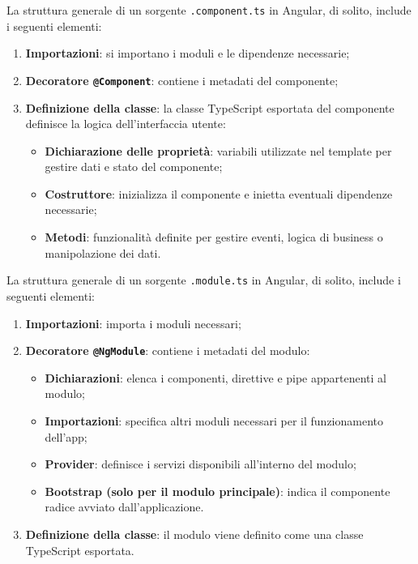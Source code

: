 La struttura generale di un sorgente \texttt{.component.ts} in Angular, di solito, include i seguenti elementi:
\begin{enumerate}
    \item \textbf{Importazioni}: si importano i moduli e le dipendenze necessarie; 
    \item \textbf{Decoratore \texttt{@Component}}: contiene i metadati del componente;
    \item \textbf{Definizione della classe}: la classe TypeScript esportata del componente definisce la logica dell'interfaccia utente:
    \begin{itemize}
        \item \textbf{Dichiarazione delle proprietà}: variabili utilizzate nel template per gestire dati e stato del componente;
        \item \textbf{Costruttore}: inizializza il componente e inietta eventuali dipendenze necessarie;
        \item \textbf{Metodi}: funzionalità definite per gestire eventi, logica di business o manipolazione dei dati.
    \end{itemize}
\end{enumerate}

La struttura generale di un sorgente \texttt{.module.ts} in Angular, di solito, include i seguenti elementi:
\begin{enumerate}
    \item \textbf{Importazioni}: importa i moduli necessari;  
    \item \textbf{Decoratore \texttt{@NgModule}}: contiene i metadati del modulo:
    \begin{itemize}
        \item \textbf{Dichiarazioni}: elenca i componenti, direttive e pipe appartenenti al modulo;
        \item \textbf{Importazioni}: specifica altri moduli necessari per il funzionamento dell’app;
        \item \textbf{Provider}: definisce i servizi disponibili all'interno del modulo;
        \item \textbf{Bootstrap (solo per il modulo principale)}: indica il componente radice avviato dall'applicazione.
    \end{itemize}
    \item \textbf{Definizione della classe}: il modulo viene definito come una classe TypeScript esportata.
\end{enumerate}


